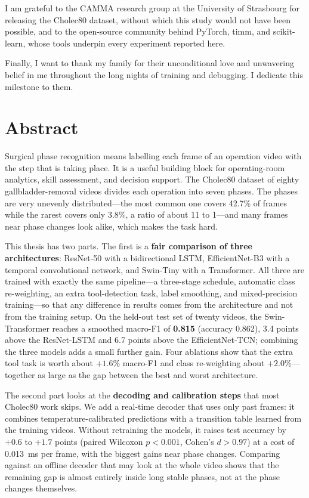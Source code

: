 \documentclass[11pt,a4paper]{report}
\begin{document}
I am grateful to the CAMMA research group at the University of Strasbourg for releasing the Cholec80 dataset, without which this study would not have been possible, and to the open-source community behind PyTorch, timm, and scikit-learn, whose tools underpin every experiment reported here.

Finally, I want to thank my family for their unconditional love and unwavering belief in me throughout the long nights of training and debugging. I dedicate this milestone to them.

\chapter*{Abstract}

Surgical phase recognition means labelling each frame of an operation video with the step that is taking place. It is a useful building block for operating-room analytics, skill assessment, and decision support. The Cholec80 dataset of eighty gallbladder-removal videos divides each operation into seven phases. The phases are very unevenly distributed---the most common one covers 42.7\% of frames while the rarest covers only 3.8\%, a ratio of about 11 to 1---and many frames near phase changes look alike, which makes the task hard.

This thesis has two parts. The first is a \textbf{fair comparison of three architectures}: ResNet-50 with a bidirectional LSTM, EfficientNet-B3 with a temporal convolutional network, and Swin-Tiny with a Transformer. All three are trained with exactly the same pipeline---a three-stage schedule, automatic class re-weighting, an extra tool-detection task, label smoothing, and mixed-precision training---so that any difference in results comes from the architecture and not from the training setup. On the held-out test set of twenty videos, the Swin-Transformer reaches a smoothed macro-F1 of \textbf{0.815} (accuracy 0.862), 3.4 points above the ResNet-LSTM and 6.7 points above the EfficientNet-TCN; combining the three models adds a small further gain. Four ablations show that the extra tool task is worth about $+1.6\%$ macro-F1 and class re-weighting about $+2.0\%$---together as large as the gap between the best and worst architecture.

The second part looks at the \textbf{decoding and calibration steps} that most Cholec80 work skips. We add a real-time decoder that uses only past frames: it combines temperature-calibrated predictions with a transition table learned from the training videos. Without retraining the models, it raises test accuracy by $+0.6$ to $+1.7$ points (paired Wilcoxon $p < 0.001$, Cohen's $d > 0.97$) at a cost of 0.013~ms per frame, with the biggest gains near phase changes. Comparing against an offline decoder that may look at the whole video shows that the remaining gap is almost entirely inside long stable phases, not at the phase changes themselves.
\end{document}
